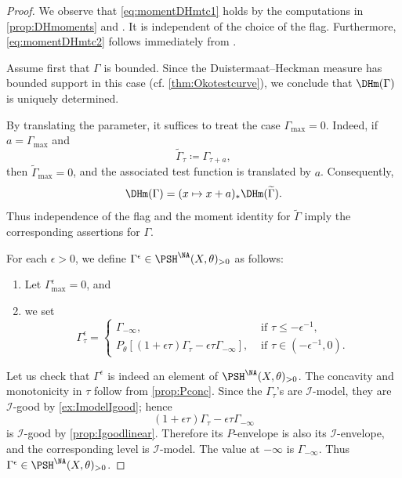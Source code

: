 \begin{proof}
We observe that \eqref{eq:momentDHmtc1} holds by the computations in \cref{prop:DHmoments} and . It is independent of the choice of the flag. Furthermore, \eqref{eq:momentDHmtc2} follows immediately from .


Assume first that $\Gamma$ is bounded.
Since the Duistermaat--Heckman measure has bounded support in this case (cf. \cref{thm:Okotestcurve}), we conclude that $\DHm(\Gamma)$ is uniquely determined.

By translating the parameter, it suffices to treat the case $\Gamma_{\max}=0$. Indeed, if $a=\Gamma_{\max}$ and
\[
    \widetilde\Gamma_\tau\coloneqq\Gamma_{\tau+a},
\]
then $\widetilde\Gamma_{\max}=0$, and the associated test function is translated by $a$. Consequently,
\[
    \DHm(\Gamma)=(x\mapsto x+a)_*\DHm(\widetilde\Gamma).
\]
Thus independence of the flag and the moment identity for $\widetilde\Gamma$ imply the corresponding assertions for $\Gamma$.

For each $\epsilon>0$, we define $\Gamma^{\epsilon}\in \PSH^{\NA}(X,\theta)_{>0}$ as follows:
\begin{enumerate}
        \item\label{itm:chapter-NApotential:L761:1} Let $\Gamma^{\epsilon}_{\max}=0$, and
        \item\label{itm:chapter-NApotential:L761:2} we set
        \[
        \Gamma^{\epsilon}_{\tau}=
        \begin{cases}
            \Gamma_{-\infty},&\text{ if }\tau\leq -\epsilon^{-1},\\
            P_{\theta}\left[ (1+\epsilon\tau)\Gamma_{\tau}-\epsilon\tau \Gamma_{-\infty} \right],&\text{ if }\tau\in \left(-\epsilon^{-1},0\right).
        \end{cases}
        \]
    \end{enumerate}
Let us check that $\Gamma^\epsilon$ is indeed an element of $\PSH^{\NA}(X,\theta)_{>0}$. The concavity and monotonicity in $\tau$ follow from \cref{prop:Pconc}. Since the $\Gamma_\tau$'s are $\mathcal I$-model, they are $\mathcal I$-good by \cref{ex:ImodelIgood}; hence
\[
(1+\epsilon\tau)\Gamma_\tau-\epsilon\tau\Gamma_{-\infty}
\]
is $\mathcal I$-good by \cref{prop:Igoodlinear}. Therefore its $P$-envelope is also its $\mathcal I$-envelope, and the corresponding level is $\mathcal I$-model. The value at $-\infty$ is
$\Gamma_{-\infty}$. Thus $\Gamma^\epsilon\in\PSH^{\NA}(X,\theta)_{>0}$.



\end{proof}
